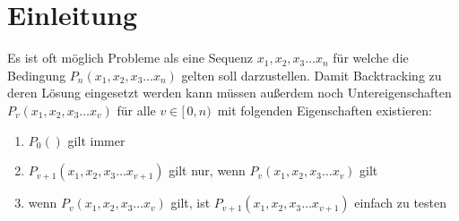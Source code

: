 \chapter{Einleitung}\label{einleitung}
Es ist oft möglich Probleme als eine Sequenz $x_{1}, x_{2}, x_{3} \dots x_{n}$ für 
welche die Bedingung $P_{n}(x_{1}, x_{2}, x_{3} \dots x_{n})$ gelten soll darzustellen.
Damit Backtracking zu deren Lösung eingesetzt werden kann müssen außerdem noch
Untereigenschaften $P_{v}(x_{1}, x_{2}, x_{3} \dots x_{v})$ für alle $v \in [ \, 0, n) \,$ 
mit folgenden Eigenschaften existieren:
\begin{enumerate}
  \item $P_{0}()$ gilt immer
  \item $P_{v + 1}(x_{1}, x_{2}, x_{3} \dots x_{v + 1})$ gilt nur, wenn $P_{v}(x_{1}, x_{2}, x_{3} \dots x_{v})$ gilt
  \item wenn $P_{v}(x_{1}, x_{2}, x_{3} \dots x_{v})$ gilt, ist $P_{v + 1}(x_{1}, x_{2}, x_{3} \dots x_{v+1})$ einfach zu testen
\end{enumerate}

